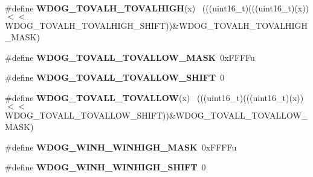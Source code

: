 \begin{DoxyCompactItemize}
\item 
\hypertarget{group___w_d_o_g___register___masks_ga186f8f5792b34501fe75c6303c530e17}{}\#define {\bfseries W\+D\+O\+G\+\_\+\+T\+O\+V\+A\+L\+H\+\_\+\+T\+O\+V\+A\+L\+H\+I\+G\+H}(x)                              ~(((uint16\+\_\+t)(((uint16\+\_\+t)(x))$<$$<$W\+D\+O\+G\+\_\+\+T\+O\+V\+A\+L\+H\+\_\+\+T\+O\+V\+A\+L\+H\+I\+G\+H\+\_\+\+S\+H\+I\+F\+T))\&W\+D\+O\+G\+\_\+\+T\+O\+V\+A\+L\+H\+\_\+\+T\+O\+V\+A\+L\+H\+I\+G\+H\+\_\+\+M\+A\+S\+K)\label{group___w_d_o_g___register___masks_ga186f8f5792b34501fe75c6303c530e17}

\item 
\hypertarget{group___w_d_o_g___register___masks_ga71c3913b6be99b211a3c3031caf8ac66}{}\#define {\bfseries W\+D\+O\+G\+\_\+\+T\+O\+V\+A\+L\+L\+\_\+\+T\+O\+V\+A\+L\+L\+O\+W\+\_\+\+M\+A\+S\+K}~0x\+F\+F\+F\+Fu\label{group___w_d_o_g___register___masks_ga71c3913b6be99b211a3c3031caf8ac66}

\item 
\hypertarget{group___w_d_o_g___register___masks_ga57ba2617b2855cd4b3d1eb0b3c878f52}{}\#define {\bfseries W\+D\+O\+G\+\_\+\+T\+O\+V\+A\+L\+L\+\_\+\+T\+O\+V\+A\+L\+L\+O\+W\+\_\+\+S\+H\+I\+F\+T}~0\label{group___w_d_o_g___register___masks_ga57ba2617b2855cd4b3d1eb0b3c878f52}

\item 
\hypertarget{group___w_d_o_g___register___masks_ga27f719a1e0f5bcf436739997e10499db}{}\#define {\bfseries W\+D\+O\+G\+\_\+\+T\+O\+V\+A\+L\+L\+\_\+\+T\+O\+V\+A\+L\+L\+O\+W}(x)                                ~(((uint16\+\_\+t)(((uint16\+\_\+t)(x))$<$$<$W\+D\+O\+G\+\_\+\+T\+O\+V\+A\+L\+L\+\_\+\+T\+O\+V\+A\+L\+L\+O\+W\+\_\+\+S\+H\+I\+F\+T))\&W\+D\+O\+G\+\_\+\+T\+O\+V\+A\+L\+L\+\_\+\+T\+O\+V\+A\+L\+L\+O\+W\+\_\+\+M\+A\+S\+K)\label{group___w_d_o_g___register___masks_ga27f719a1e0f5bcf436739997e10499db}

\item 
\hypertarget{group___w_d_o_g___register___masks_ga6efef6fddbc8b8600a8dee5a24659068}{}\#define {\bfseries W\+D\+O\+G\+\_\+\+W\+I\+N\+H\+\_\+\+W\+I\+N\+H\+I\+G\+H\+\_\+\+M\+A\+S\+K}~0x\+F\+F\+F\+Fu\label{group___w_d_o_g___register___masks_ga6efef6fddbc8b8600a8dee5a24659068}

\item 
\hypertarget{group___w_d_o_g___register___masks_ga362e7a13b632027b940135991c9d169b}{}\#define {\bfseries W\+D\+O\+G\+\_\+\+W\+I\+N\+H\+\_\+\+W\+I\+N\+H\+I\+G\+H\+\_\+\+S\+H\+I\+F\+T}~0\label{group___w_d_o_g___register___masks_ga362e7a13b632027b940135991c9d169b}


\end{DoxyCompactItemize}
